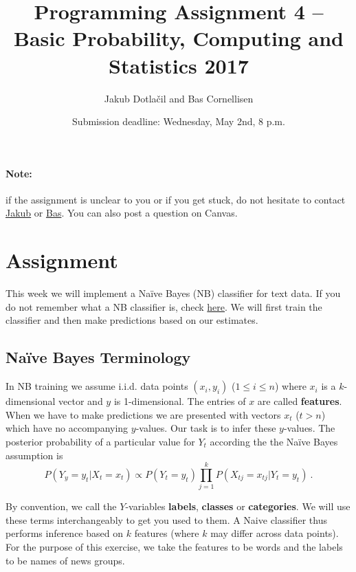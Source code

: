 \documentclass[11pt, a4paper]{article}
\title{Programming Assignment 4 -- Basic Probability, Computing and Statistics 2017}
\author{Jakub Dotla\v{c}il and Bas Cornellisen}
\date{Submission deadline: Wednesday, May 2nd, 8 p.m.}
\begin{document}
\maketitle

\paragraph{Note:} if the assignment is unclear to you or if you get stuck, do not hesitate to contact \href{mailto:j.dotlacil@uva.nl}{Jakub} or \href{mailto:bjmcornelissen@gmail.com}{Bas}. You can also post a question on Canvas.

\section{Assignment}

This week we will implement a Na\"ive Bayes (NB) classifier for text data. If you do not remember what a 
NB classifier is, check \href{https://github.com/BasicProbability/LectureNotes/blob/master/chapter4/chapter4.pdf}{here}. 
We will first train the classifier and then make predictions based on our estimates.

\subsection{Na\"ive Bayes Terminology}

In NB training we assume i.i.d. data points $ (x_{i},y_{i}) $ ($ 1 \leq i \leq n $) where $ x_{i} $ is a $ k $-dimensional vector and
$ y $ is 1-dimensional. The entries of $ x $ are called \textbf{features}. When we have to make predictions we are presented with vectors
$ x_{t} $ ($ t > n $) which have no accompanying $ y $-values. Our task is to infer these $ y $-values. The posterior probability of a particular value
for $ Y_{t} $ according the the Na\"ive Bayes assumption is
\begin{equation}
P(Y_{y} = y_{t}|X_{t} = x_{t}) \propto P(Y_{t} = y_{t}) \prod_{j=1}^{k}P(X_{tj} = x_{tj}|Y_{t} = y_{t}) \ .
\end{equation}

By convention, we call the $ Y $-variables \textbf{labels}, \textbf{classes} or \textbf{categories}. We will use these terms interchangeably to get you used
to them. A Naive classifier thus performs inference based on $ k $ features (where $ k $ may differ across data points). For the purpose of this exercise, we take the 
features to be words and the labels to be names of news groups.
\end{document}
